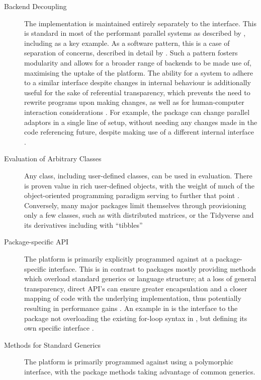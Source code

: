 \begin{description}
	\item[Backend Decoupling]
		The implementation is maintained entirely separately to the interface.
		This is standard in most of the performant parallel \R{} systems as described by \textcite{eddelbuettel2019parallel}, including  as a key example\cite{microsoft20}.
		As a software pattern, this is a case of separation of concerns, described in detail by \textcite{dijkstra1982role}.
		Such a pattern fosters modularity and allows for a broader range of backends to be made use of, maximising the uptake of the platform.
		The ability for a system to adhere to a similar interface despite changes in internal behaviour is additionally useful for the sake of referential transparency, which prevents the need to rewrite programs upon making changes, as well as for human-computer interaction considerations \cites{sondergaard1990Rtda,norman2013design}.
		For example, the  package can change parallel adaptors in a single line of setup, without needing any changes made in the code referencing future, despite making use of a different internal interface \cite{weston19:_using}.
	\item[Evaluation of Arbitrary Classes]
		Any class, including user-defined classes, can be used in evaluation.
		There is proven value in rich user-defined objects, with the weight of much of the object-oriented programming paradigm serving to further that point \cite{dahl2004simula}.
		Conversely, many major packages limit themselves through provisioning only a few classes, such as  with distributed matrices, or the Tidyverse and its derivatives including  with ``tibbles'' \cites{pbdDMATpackage,wickham2019welcome} \item[Package-specific API] The platform is primarily explicitly programmed against at a package-specific interface.
		This is in contrast to packages mostly providing methods which overload standard generics or language structure; at a loss of general transparency, direct API's can ensure greater encapsulation and a closer mapping of code with the underlying implementation, thus potentially resulting in performance gains \cite{bierhoff2009api}.
		An example in \R{} is the interface to the  package not overloading the existing for-loop syntax in \R{}, but defining its own specific interface \cite{microsoft20}.
	\item[Methods for Standard Generics]
		The platform is primarily programmed against using a polymorphic
		interface, with the package methods taking advantage of common generics.

\end{description}
